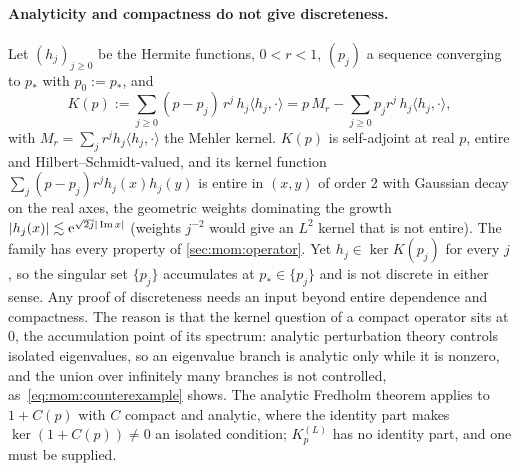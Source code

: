 \paragraph{Analyticity and compactness do not give discreteness.}
Let $(h_j)_{j \ge 0}$ be the Hermite functions, $0 < r < 1$, $(p_j)$ a sequence converging to $p_*$ with $p_0 := p_*$, and
\begin{equation}
  \label{eq:mom:counterexample}
  K(p)
    := \sum_{j \ge 0} (p - p_j) \, r^j \, h_j \langle h_j, \cdot \rangle
    = p \, M_r - \sum_{j \ge 0} p_j r^j \, h_j \langle h_j, \cdot \rangle,
\end{equation}
with $M_r = \sum_j r^j h_j \langle h_j, \cdot \rangle$ the Mehler kernel.
$K(p)$ is self-adjoint at real $p$, entire and Hilbert--Schmidt-valued, and its kernel function $\sum_j (p - p_j) r^j h_j(x) h_j(y)$ is entire in $(x, y)$ of order 2 with Gaussian decay on the real axes, the geometric weights dominating the growth ${|h_j(x)|} \lesssim \mathrm{e}^{\sqrt{2 j} {|\operatorname{Im} x|}}$ (weights $j^{-2}$ would give an $L^2$ kernel that is not entire).
The family has every property of \cref{sec:mom:operator}.
Yet $h_j \in \ker K(p_j)$ for every $j$, so the singular set $\{p_j\}$ accumulates at $p_* \in \{p_j\}$ and is not discrete in either sense.
Any proof of discreteness needs an input beyond entire dependence and compactness.
The reason is that the kernel question of a compact operator sits at $0$, the accumulation point of its spectrum: analytic perturbation theory controls isolated eigenvalues, so an eigenvalue branch is analytic only while it is nonzero, and the union over infinitely many branches is not controlled, as~\eqref{eq:mom:counterexample} shows.
The analytic Fredholm theorem applies to $1 + C(p)$ with $C$ compact and analytic, where the identity part makes $\ker (1 + C(p)) \ne 0$ an isolated condition; $K^{(L)}_p$ has no identity part, and one must be supplied.

